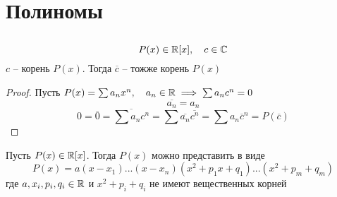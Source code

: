 \chapter{Полиномы}

\section{}

\begin{lemma}
	$$ P(x) \in \mathbb{R}[x], \quad c \in \mathbb{C} $$
    $c$ -- корень $P(x)$. Тогда $\overline{c}$ -- тожже корень $P(x)$
\end{lemma}

\begin{proof}
    Пусть $P(x) = \sum a_nx^n, \quad a_n \in \mathbb{R} \implies \sum a_nc^n = 0 $
    $$ \overline{a_n} = a_n $$
    $$ 0 = \overline{0} = \overline{\sum a_nc^n} = \sum \overline{a_n} \overline{c^n} = \sum a_n \overline{c}^n = P(\overline{c}) $$
\end{proof}

\begin{theorem}
	Пусть $P(x) \in \mathbb{R}[x] $. Тогда $P(x)$ можно представить в виде
    $$ P(x) = a(x-x_1)...(x-x_n)(x^2 + p_1x + q_1)...(x^2 + p_m + q_m) $$
    где $a, x_i, p_i, q_i \in \mathbb{R} $ и $x^2 + p_i + q_i $ не имеют вещественных корней
\end{theorem}

